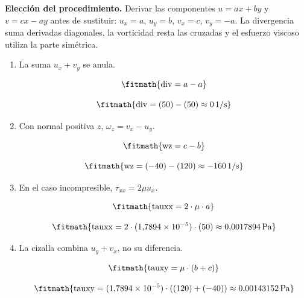 \noindent\textbf{Elección del procedimiento.} Derivar las componentes $u=ax+by$ y $v=cx-ay$ antes de sustituir: $u_x=a$, $u_y=b$, $v_x=c$, $v_y=-a$. La divergencia suma derivadas diagonales, la vorticidad resta las cruzadas y el esfuerzo viscoso utiliza la parte simétrica.

\begin{enumerate}

\item La suma $u_x+v_y$ se anula.

\[\fitmath{\mathrm{div}=a-a}\]

\[\fitmath{\mathrm{div}=(50)-(50)\approx 0\,\mathrm{1/s}}\]

\item Con normal positiva $z$, $\omega_z=v_x-u_y$.

\[\fitmath{\mathrm{wz}=c-b}\]

\[\fitmath{\mathrm{wz}=(-40)-(120)\approx -160\,\mathrm{1/s}}\]

\item En el caso incompresible, $\tau_{xx}=2\mu u_x$.

\[\fitmath{\mathrm{tauxx}=2\cdot \mu\cdot a}\]

\[\fitmath{\mathrm{tauxx}=2\cdot (1{,}7894\times10^{-5})\cdot (50)\approx 0{,}0017894\,\mathrm{Pa}}\]

\item La cizalla combina $u_y+v_x$, no su diferencia.

\[\fitmath{\mathrm{tauxy}=\mu\cdot \left(b+c\right)}\]

\[\fitmath{\mathrm{tauxy}=(1{,}7894\times10^{-5})\cdot \left((120)+(-40)\right)\approx 0{,}00143152\,\mathrm{Pa}}\]

\end{enumerate}
